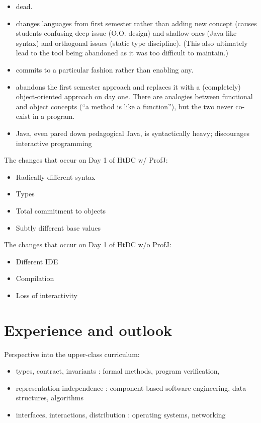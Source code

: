 \documentclass[submission,copyright]{eptcs}
\begin{document}
\begin{itemize}
\item dead.
\item changes languages from first semester rather than adding new
  concept (causes students confusing deep issue (O.O. design) and
  shallow ones (Java-like syntax) and orthogonal issues (static type
  discipline).  (This also ultimately lead to the tool being abandoned
  as it was too difficult to maintain.)

\item commits to a particular fashion rather than enabling any.

\item abandons the first semester approach and replaces it with a
  (completely) object-oriented approach on day one.  There are
  analogies between functional and object concepts (``a method is like
  a function''), but the two never co-exist in a program.

\item Java, even pared down pedagogical Java, is syntactically heavy; discourages
  interactive programming

\end{itemize}

The changes that occur on Day 1 of HtDC w/ ProfJ:

\begin{itemize}
\item Radically different syntax
\item Types
\item Total commitment to objects
\item Subtly different base values
\end{itemize}

The changes that occur on Day 1 of HtDC w/o ProfJ:

\begin{itemize}
\item Different IDE
\item Compilation
\item Loss of interactivity
\end{itemize}

\section{Experience and outlook}
\label{sec:conclusion}

Perspective into the upper-class curriculum:

\begin{itemize}
\item types, contract, invariants : formal methods, program verification,
  
\item representation independence : component-based software engineering,
  data-structures, algorithms

\item interfaces, interactions, distribution : operating systems, networking
\end{itemize}
\end{document}
